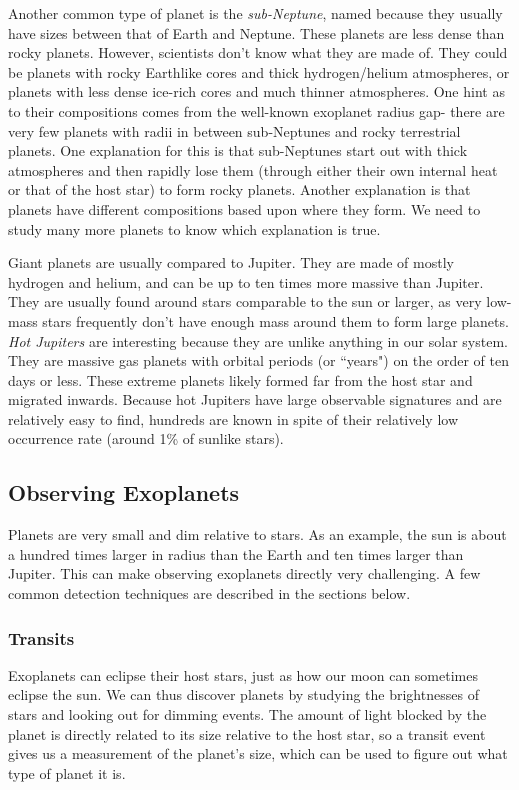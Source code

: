 Another common type of planet is the \textit{sub-Neptune}, named because they usually have sizes between that of Earth and Neptune.  These planets are less dense than rocky planets.  However, scientists don't know what they are made of.  They could be planets with rocky Earthlike cores and thick hydrogen/helium atmospheres, or planets with less dense ice-rich cores and much thinner atmospheres.  One hint as to their compositions comes from the well-known exoplanet radius gap- there are very few planets with radii in between sub-Neptunes and rocky terrestrial planets.  One explanation for this is that sub-Neptunes start out with thick atmospheres and then rapidly lose them (through either their own internal heat or that of the host star) to form rocky planets.  Another explanation is that planets have different compositions based upon where they form.  We need to study many more planets to know which explanation is true.

Giant planets are usually compared to Jupiter.  They are made of mostly hydrogen and helium, and can be up to ten times more massive than Jupiter. They are usually found around stars comparable to the sun or larger, as very low-mass stars frequently don't have enough mass around them to form large planets.  \textit{Hot Jupiters} are interesting because they are unlike anything in our solar system.  They are massive gas planets with orbital periods (or ``years") on the order of ten days or less.  These extreme planets likely formed far from the host star and migrated inwards.  Because hot Jupiters have large observable signatures and are relatively easy to find, hundreds are known in spite of their relatively low occurrence rate (around 1\% of sunlike stars).

\subsection{Observing Exoplanets}

Planets are very small and dim relative to stars.  As an example, the sun is about a hundred times larger in radius than the Earth and ten times larger than Jupiter.  This can make observing exoplanets directly very challenging.  A few common detection techniques are described in the sections below.

\subsubsection{Transits}
Exoplanets can eclipse their host stars, just as how our moon can sometimes eclipse the sun.  We can thus discover planets by studying the brightnesses of stars and looking out for dimming events.  The amount of light blocked by the planet is directly related to its size relative to the host star, so a transit event gives us a measurement of the planet’s size, which can be used to figure out what type of planet it is.

